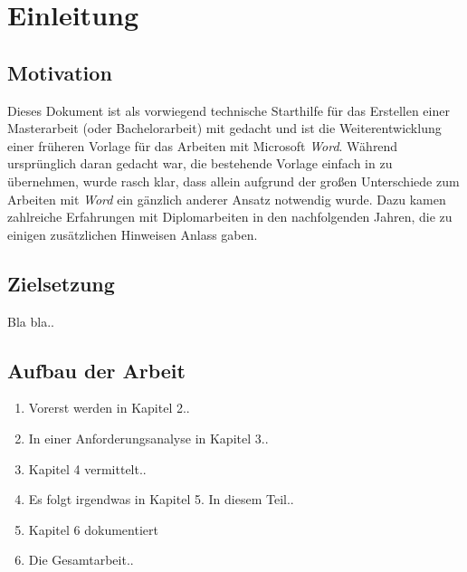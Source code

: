 \chapter{Einleitung}
\label{cha:Einleitung}

\section{Motivation}

Dieses Dokument ist als vorwiegend technische Starthilfe für das
Erstellen einer Masterarbeit (oder Bachelorarbeit) mit \latex
gedacht und ist die Weiterentwicklung einer früheren
Vorlage für das Arbeiten mit
Microsoft \emph{Word}. Während ursprünglich daran gedacht war, die
bestehende Vorlage einfach in \latex zu übernehmen, wurde rasch
klar, dass allein aufgrund der großen Unterschiede zum Arbeiten
mit \emph{Word} ein gänzlich anderer Ansatz notwendig wurde. Dazu
kamen zahlreiche Erfahrungen mit Diplomarbeiten in den
nachfolgenden Jahren, die zu einigen zusätzlichen Hinweisen Anlass gaben.

\section{Zielsetzung}

Bla bla..


\section{Aufbau der Arbeit}

\begin{enumerate}
	\item Vorerst werden in Kapitel 2..
	\item In einer Anforderungsanalyse in Kapitel 3..
	\item Kapitel 4 vermittelt..
	\item Es folgt irgendwas in Kapitel 5. In diesem Teil..
	\item Kapitel 6 dokumentiert
	\item Die Gesamtarbeit..
\end{enumerate}






